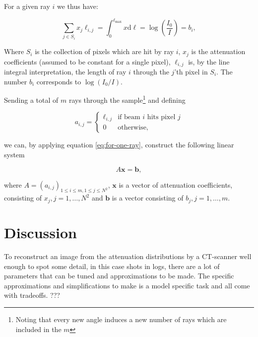 \documentclass{article}
\begin{document}

For a given ray $i$ we thus have:

\begin{equation}\label{eq:for-one-ray}
    \sum_{j \in S_i} x_j \ell_{i, j} = \int_{0}^{\ell_{\max}}x \text{d} \ell = \log\left(\frac{I_0}{I}\right) = b_i,
\end{equation}

Where $S_i$ is the collection of pixels which are hit by ray $i$, $x_j$ is the attenuation coefficients (assumed to be constant for a single pixel), $\ell_{i, j}$ is, by the line integral interpretation, the length of ray $i$ through the $j$'th pixel in $S_i$. The number $b_i$ corresponds to $\log{(I_0 / I)}$. 

Sending a total of $m$ rays through the sample\footnote{Noting that every new angle induces a new number of rays which are included in the $m$}  and defining

\begin{equation}
    a_{i, j} = 
    \begin{cases}
        \ell_{i, j} & \text{if beam $i$ hits pixel $j$} \\
        0 & \text{otherwise,}
    \end{cases}
\end{equation}

we can, by applying equation \ref{eq:for-one-ray}, construct the following linear system

\begin{equation}
    A \boldsymbol{x} = \boldsymbol{b},
\end{equation}

where $A = (a_{i,j})_{1 \leq i \leq m, 1 \leq j \leq N^2}$, $\boldsymbol{x}$ is a vector of attenuation coefficients, consisting of $x_j, j = 1, \dots, N^2$ and $\boldsymbol{b}$ is a vector consisting of $b_j, j = 1, \dots, m$. 



\section{Discussion}
To reconstruct an image from the attenuation distributions by a CT-scanner well enough to spot some detail, in this case shots in logs, there are a lot of parameters that can be tuned and approximations to be made. The specific approximations and simplifications to make is a model specific task and all come with tradeoffs.
???
\end{document}
